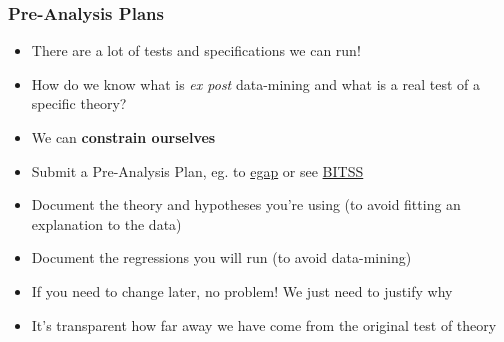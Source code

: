\documentclass[xcolor=x11names,compress]{beamer}\usepackage[]{graphicx}\usepackage[]{color}
\renewcommand{\(}{\begin{columns}}
\renewcommand{\)}{\end{columns}}
\newcommand{\<}[1]{\begin{column}{#1}}
\renewcommand{\>}{\end{column}}
\begin{document}
\begin{frame}
\frametitle{Pre-Analysis Plans}
\begin{itemize}
\item There are a lot of tests and specifications we can run!
\pause
\item How do we know what is \textit{ex post} data-mining and what is a real test of a specific theory?
\pause
\item We can \textbf{constrain ourselves}
\pause
\item Submit a Pre-Analysis Plan, eg. to \href{https://egap.org/content/registration}{egap} or see \href{https://www.bitss.org/resource-tag/pre-analysis-plans/}{BITSS}
\pause
\item Document the theory and hypotheses you're using (to avoid fitting an explanation to the data)
\pause
\item Document the regressions you will run (to avoid data-mining)
\pause
\item If you need to change later, no problem! We just need to justify why
\pause
\item It's transparent how far away we have come from the original test of theory
\end{itemize}
\end{frame}
\end{document}
